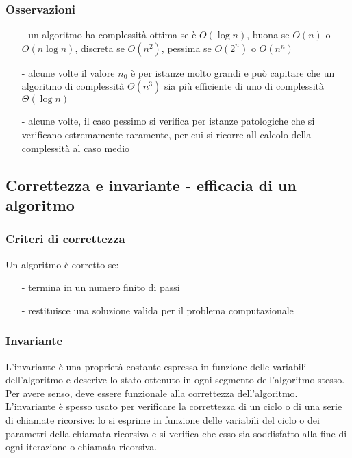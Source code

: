 \documentclass[a4paper]{article}
\begin{document}
\subsubsection*{Osservazioni}
\begin{itemize}[topsep=3pt, itemsep=0pt]
	\item[-] un algoritmo ha complessità ottima se è \(O(\log n)\), buona se \(O(n)\) o \(O(n \log n)\), discreta se \(O(n^2)\),
	pessima se \(O(2^n)\) o \(O(n^n)\)
	\item[-] alcune volte il valore \(n_0\) è per istanze molto grandi e può capitare che un algoritmo di complessità \(\Theta(n^3)\)
	sia più efficiente di uno di complessità \(\Theta(\log n)\)
	\item[-] alcune volte, il caso pessimo si verifica per istanze patologiche che si verificano estremamente raramente, per cui
	si ricorre all calcolo della complessità al caso medio
\end{itemize}

\subsection{Correttezza e invariante - efficacia di un algoritmo}
\subsubsection*{Criteri di correttezza}
Un algoritmo è corretto se:
\begin{itemize}[topsep=3pt, itemsep=0pt]
	\item[-] termina in un numero finito di passi
	\item[-] restituisce una soluzione valida per il problema computazionale
\end{itemize}

\subsubsection*{Invariante}
L'invariante è una proprietà costante espressa in funzione delle variabili dell'algoritmo e descrive lo stato ottenuto in ogni
segmento dell'algoritmo stesso. Per avere senso, deve essere funzionale alla correttezza dell'algoritmo.
L'invariante è spesso usato per verificare la correttezza di un ciclo o di una serie di chiamate ricorsive: lo si esprime
in funzione delle variabili del ciclo o dei parametri della chiamata ricorsiva e si verifica che esso sia soddisfatto alla
fine di ogni iterazione o chiamata ricorsiva.
\end{document}
